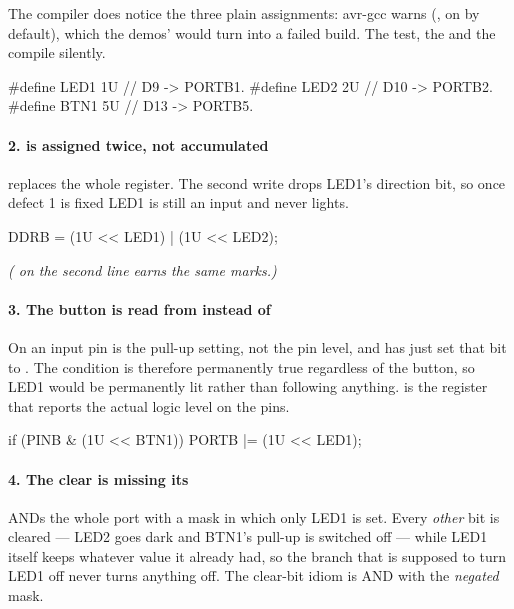 The compiler does notice the three plain assignments: avr-gcc warns
 (, on by default),
which the demos'  would turn into a failed build. The test, the \code{|=} and the
\code{&=} compile silently.

\begin{ccode}
#define LED1 1U // D9  -> PORTB1.
#define LED2 2U // D10 -> PORTB2.
#define BTN1 5U // D13 -> PORTB5.
\end{ccode}

\paragraph{2.  is assigned twice, not accumulated}
\code{=} replaces the whole register. The second write drops LED1's direction bit, so once defect 1
is fixed LED1 is still an input and never lights.

\begin{ccode}
DDRB = (1U << LED1) | (1U << LED2);
\end{ccode}

\noindent\textit{( on the second line earns the same marks.)}

\paragraph{3. The button is read from  instead of }
On an input pin  is the pull-up setting, not the pin level, and  has just
set that bit to . The condition is therefore permanently true regardless of the button, so
LED1 would be permanently lit rather than following anything.  is the register that
reports the actual logic level on the pins.

\begin{ccode}
if (PINB & (1U << BTN1)) { PORTB |= (1U << LED1); }
\end{ccode}

\paragraph{4. The clear is missing its \code{~}}
 ANDs the whole port with a mask in which only LED1 is set. Every
\emph{other} bit is cleared --- LED2 goes dark and BTN1's pull-up is switched off --- while LED1
itself keeps whatever value it already had, so the branch that is supposed to turn LED1 off never
turns anything off. The clear-bit idiom is AND with the \emph{negated} mask.

